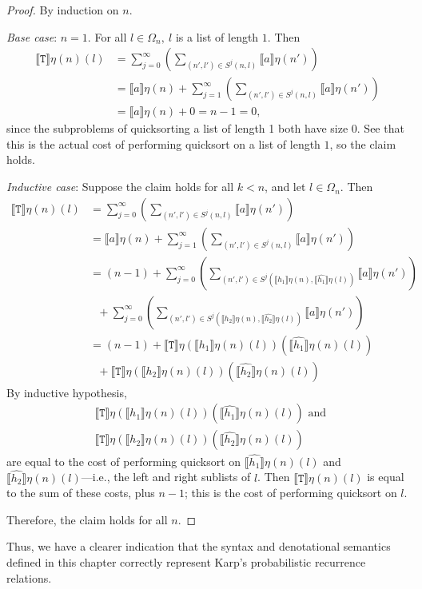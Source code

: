 \begin{proof}
By induction on $n$.

\emph{Base case}: $n = 1$.  For all $l \in \Omega_n, \ l$ is a list of length $1$. Then
\begin{align*}
\llbracket \texttt{T} \rrbracket\eta (n)(l) &=  \sum_{j=0}^{\infty}(\sum_{(n',l') \in S^j(n,l)} \llbracket a \rrbracket\eta(n')) \\
&= \llbracket a \rrbracket\eta(n) + \sum_{j=1}^{\infty}(\sum_{(n',l') \in S^j(n,l)} \llbracket a \rrbracket\eta(n')) \\
&= \llbracket a \rrbracket\eta(n) + 0 = n - 1 = 0,
\end{align*}
since the subproblems of quicksorting a list of length 1 both have size $0$. See that this is the actual cost of performing
quicksort on a list of length $1$, so the claim holds.

\emph{Inductive case}: Suppose the claim holds for all $k < n$, and let $l \in \Omega_n$. Then
\begin{align*}
 \llbracket \texttt{T} \rrbracket\eta (n)(l) &=  \sum_{j=0}^{\infty}(\sum_{(n',l') \in S^j(n,l)} \llbracket a \rrbracket\eta(n')) \\
 &= \llbracket a \rrbracket\eta(n) + \sum_{j=1}^{\infty}(\sum_{(n',l') \in S^j(n,l)} \llbracket a \rrbracket\eta(n')) \\
&= (n-1) + \sum_{j=0}^{\infty}(\sum_{(n',l') \in S^j(\llbracket h_1 \rrbracket\eta(n),
\llbracket \hat{h_1} \rrbracket \eta(l))} \llbracket a \rrbracket\eta(n')) \\
 & \text{ \ \ \ \ \ \ \ \ \ \ \ \ } + \sum_{j=0}^{\infty}(\sum_{(n',l') \in S^j(\llbracket h_2 \rrbracket \eta(n),
 \llbracket \hat{h_2} \rrbracket \eta(l))} \llbracket a \rrbracket\eta(n')) \\
 &= (n-1) + \llbracket \texttt{T} \rrbracket\eta(\llbracket h_1 \rrbracket\eta(n)(l))(\llbracket \hat{h_1} \rrbracket\eta(n)(l)) \\
 &\text{ \ \ \ \ \ \ \ \ \ \ \ \ }+  \llbracket \texttt{T} \rrbracket\eta(\llbracket h_2 \rrbracket\eta(n)(l))(\llbracket \hat{h_2} \rrbracket\eta(n)(l))  
\end{align*}
By inductive hypothesis, 
\begin{align*}
&\llbracket \texttt{T} \rrbracket\eta(\llbracket h_1 \rrbracket\eta(n)(l))(\llbracket \hat{h_1} \rrbracket\eta(n)(l)) \text{ and } \\
&\llbracket \texttt{T} \rrbracket\eta(\llbracket h_2 \rrbracket\eta(n)(l))(\llbracket \hat{h_2} \rrbracket\eta(n)(l))
\end{align*}
 are equal
to the cost of performing quicksort on $\llbracket \hat{h_1} \rrbracket\eta(n)(l)$ and
$\llbracket \hat{h_2} \rrbracket\eta(n)(l)$---i.e., the left and right sublists of $l$. Then $\llbracket \texttt{T} \rrbracket\eta (n)(l)$ is equal 
to the sum of these costs, plus $n-1$; this is the cost of performing quicksort on $l$.

Therefore, the claim holds for all $n$.
\end{proof}
Thus, we have a clearer indication that the syntax and denotational semantics defined in this chapter correctly 
represent Karp's probabilistic recurrence relations.

